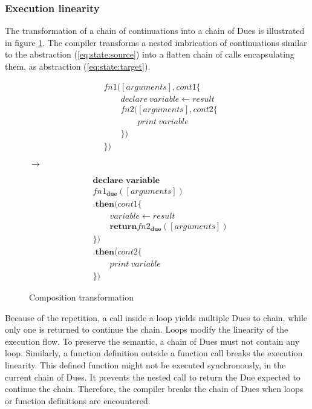 \subsubsection{Execution linearity}

The transformation of a chain of continuations into a chain of Dues is illustrated in figure \ref{fig:comp-transform}.
The compiler transforms a nested imbrication of continuations similar to the abstraction (\ref{eq:state:source}) into a flatten chain of calls encapsulating them, as abstraction (\ref{eq:state:target}).

\begin{figure}[h!]
  \begin{minipage}{0.40\textwidth}
    \centering
    \begin{align} \label{eq:state:source}
    &fn1([arguments], cont1 \{\nonumber\\
    &\qquad  declare ~ variable \leftarrow result\nonumber\\
    &\qquad  fn2([arguments], cont2 \{\nonumber\\
    &\qquad\qquad    print ~ variable\nonumber\\
    &\qquad  \})\nonumber\\
    &\})
    \end{align}
  \end{minipage}
  \hfill
  $\to$
  \hfill
  \begin{minipage}{0.40\textwidth}
    \centering
    \begin{align} \label{eq:state:target}
    &\textbf{declare variable}\nonumber\\
    &fn1_\textbf{due}([arguments])\nonumber\\
    &\textbf{.then}(cont1\{\nonumber\\
    &\qquad  variable \leftarrow result\nonumber\\
    &\qquad  \textbf{return} fn2_\textbf{due}([arguments])\nonumber\\
    &\})\nonumber\\
    &\textbf{.then}(cont2\{\nonumber\\
    &\qquad  print ~ variable\nonumber\\
    &\})
    \end{align}
  \end{minipage}
  \label{fig:comp-transform}
  \caption{Composition transformation}
\end{figure}

Because of the repetition, a call inside a loop yields multiple Dues to chain, while only one is returned to continue the chain.
Loops modify the linearity of the execution flow.
To preserve the semantic, a chain of Dues must not contain any loop.
Similarly, a function definition outside a function call breaks the execution linearity.
This defined function might not be executed synchronously, in the current chain of Dues.
It prevents the nested call to return the Due expected to continue the chain.
Therefore, the compiler breaks the chain of Dues when loops or function definitions are encountered.

